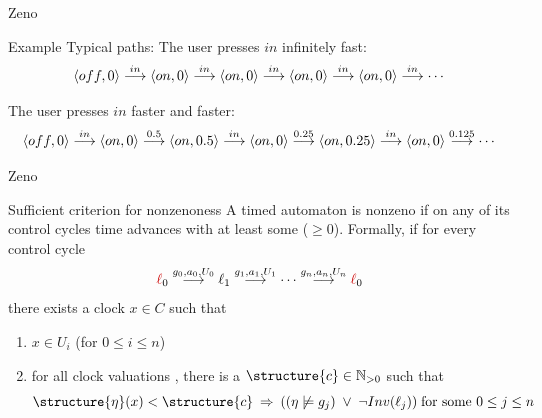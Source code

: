 \documentclass[aspectratio=169]{beamer}
\begin{document}
\begin{slide}{Zeno}
\small


\begin{block}{Example}
\alert{Typical paths:}
The user presses $in$ \alert{infinitely fast}:
\begin{equation*}
\mathopen{\langle}off,0\mathclose{\rangle}  \stackrel{in}{\longrightarrow}  \mathopen{\langle}on,0\mathclose{\rangle}  \stackrel{in}{\longrightarrow}  \mathopen{\langle}on,0\mathclose{\rangle}  \stackrel{in}{\longrightarrow}  \mathopen{\langle}on,0\mathclose{\rangle}  \stackrel{in}{\longrightarrow}  \mathopen{\langle}on,0\mathclose{\rangle}  \stackrel{in}{\longrightarrow} \cdots
\end{equation*}


The user presses $in$ \alert{faster and faster}:
\begin{equation*}
\mathopen{\langle}off,0\mathclose{\rangle}  \stackrel{in}{\longrightarrow}   \mathopen{\langle}on,0\mathclose{\rangle}  \stackrel{0.5}{\longrightarrow} \mathopen{\langle}on,0.5\mathclose{\rangle} \stackrel{in}{\longrightarrow} \mathopen{\langle}on,0\mathclose{\rangle} \stackrel{0.25}{\longrightarrow}  \mathopen{\langle}on,0.25\mathclose{\rangle}   \stackrel{in}{\longrightarrow} \mathopen{\langle}on,0\mathclose{\rangle}  \stackrel{0.125}{\longrightarrow}  \cdots
\end{equation*}
\end{block}



\end{slide}


\begin{slide}{Zeno}
\small


\begin{block}{Sufficient criterion for nonzenoness}
A timed automaton is nonzeno if on any of its control cycles time advances with at least some  
 ($\geq 0$). Formally, if for every control cycle
\begin{equation*}
{\red \ell_0} \tran{g_0, a_0, U_0} \ell_1 \tran{g_1, a_1, U_1} \cdots  \tran{g_n, a_n, U_n} {\red \ell_0} 
\end{equation*}
there exists a clock $x \in C$ such that
\begin{enumerate}
\item  $x \in U_i$ (for $0 \leq i \leq n$)
\item for all clock valuations \structure{$\eta$}, there is a  $\structure{c} \in \N_{>0}$ such that
\begin{equation*}
\structure{\eta}(x) < \structure{c}\; \imp\; ((\eta \not\models g_j)\; \ou\; \lnot Inv(\ell_j)) \; \text{for some $0 \leq j \leq n$}
\end{equation*}
\end{enumerate}


\end{block}

\end{slide}
\end{document}
